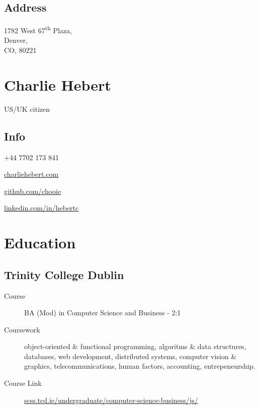 \documentclass[a4paper]{article}
\begin{document}

\noindent\begin{minipage}[t]{0.333\textwidth}  
  \subsection*{Address}
  1782 West 67\textsuperscript{th} Plaza,\\
  Denver,\\
  CO, 80221\\
\end{minipage}
\noindent\begin{minipage}[t]{0.333\textwidth}
  \center
  \section*{Charlie Hebert}
  US/UK citizen
\end{minipage}
\noindent\begin{minipage}[t]{0.333\textwidth}
  \begin{flushright}
    \section*{Info}
  \end{flushright}

  \begin{description}
  \raggedleft
  \item[Mob] +44 7702 173 841
  \item[Web] \href{http://www.charliehebert.com}{charliehebert.com}
  \item[Github] \href{http://www.github.com/chooie}{github.com/chooie}
  \item[LinkedIn] \href{http://linkedin.com/in/hebertc}{linkedin.com/in/hebertc}
  \end{description}
\end{minipage}

\section*{Education}

\subsection*{Trinity College Dublin}
\begin{description}
\item[Course] BA (Mod) in Computer Science and Business - 2:1
\item[Coursework] object-oriented \& functional programming, algoritms \& data structures, databases, web development, distributed systems, computer vision \& graphics, telecommunications, human factors, accounting, entrepeneurship.
\item[Course Link] \href{https://www.scss.tcd.ie/undergraduate/computer-science-business/js/}{scss.tcd.ie/undergraduate/computer-science-business/js/}
\end{description}
\end{document}
